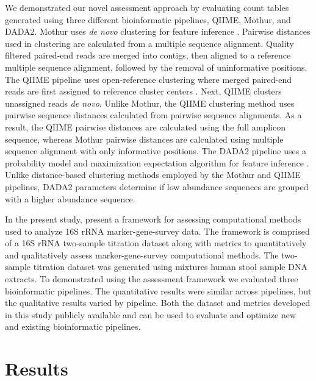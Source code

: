 \documentclass[linenumbers]{bmcart}
\begin{document}

We demonstrated our novel assessment approach by evaluating count tables
generated using three different bioinformatic pipelines, QIIME, Mothur, and
DADA2. Mothur uses \emph{de novo} clustering for feature
inference \cite{westcott2017opticlust, schloss2009introducing}.
Pairwise distances used in clustering are calculated from a multiple
sequence alignment. Quality filtered paired-end reads are merged
into contigs, then aligned to a reference multiple
sequence alignment, followed by the removal of uninformative positions. 
The QIIME pipeline uses open-reference clustering
where merged paired-end reads are first assigned to reference cluster
centers \cite{Rideout2014, Caporaso2010}. Next, QIIME clusters
unassigned reads \emph{de novo}. Unlike Mothur, the QIIME clustering
method uses pairwise sequence distances calculated from pairwise
sequence alignments. As a result, the QIIME pairwise distances are
calculated using the full amplicon sequence, whereas
Mothur pairwise distances are calculated using multiple
sequence alignment with only informative positions. 
The DADA2 pipeline uses a probability model and
maximization expectation algorithm for feature inference
\cite{callahan2016dada2}. Unlike distance-based clustering methods
employed by the Mothur and QIIME pipelines, DADA2 parameters determine
if low abundance sequences are grouped with a higher abundance sequence.

In the present study, present a framework for assessing computational methods used to
analyze 16S rRNA marker-gene-survey data. The framework is comprised of a 16S rRNA 
two-sample titration dataset along with metrics to quantitatively and qualitatively assess 
marker-gene-survey computational methods. The two-sample titration dataset was generated using mixtures human stool sample DNA extracts. To demonstrated using the assessment 
framework we evaluated three bioinformatic pipelines. The quantitative results were similar
across pipelines, but the qualitative results varied by pipeline. Both the dataset and
metrics developed in this study publicly available and can be used to evaluate and optimize
new and existing bioinformatic pipelines.


\section*{Results}
\end{document}
